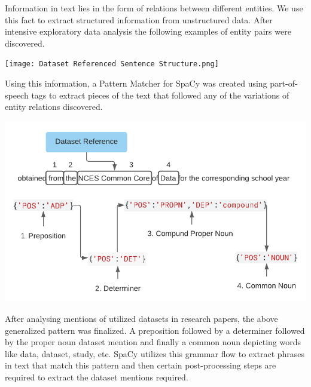 \documentclass[twocolumn]{article}
\begin{document}
Information in text lies in the form of relations between different entities. We use this fact to extract structured information from unstructured data. After intensive exploratory data analysis the following examples of entity pairs were discovered.\par

\begin{center}
\hspace*{-0.1cm}
\texttt{[image: Dataset Referenced Sentence Structure.png]}\par
\end{center}

Using this information, a Pattern Matcher for SpaCy was created using part-of-speech tags to extract pieces of the text that followed any of the variations of entity relations discovered. \par

\begin{center}
\hspace*{-0.4cm}
\includegraphics[scale=0.6]{Dataset Referenced Pattern Structure.png}
\end{center}

After analysing mentions of utilized datasets in research papers, the above generalized pattern was finalized. A preposition followed by a determiner followed by the proper noun dataset mention and finally a common noun depicting words like data, dataset, study, etc. SpaCy utilizes this grammar flow to extract phrases in text that match this pattern and then certain post-processing steps are required to extract the dataset mentions required.\par
\end{document}
